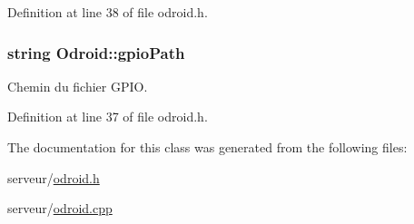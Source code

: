 Definition at line 38 of file odroid.\-h.

\hypertarget{classOdroid_af59f177765cdc44dd1bca01f1d2e568c}{
\subsubsection[{gpio\-Path}]{\setlength{\rightskip}{0pt plus 5cm}string Odroid\-::gpio\-Path\hspace{0.3cm}{\ttfamily [private]}}}\label{classOdroid_af59f177765cdc44dd1bca01f1d2e568c}
Chemin du fichier G\-P\-I\-O. 

Definition at line 37 of file odroid.\-h.



The documentation for this class was generated from the following files\-:\begin{DoxyCompactItemize}
\item 
serveur/\hyperlink{odroid_8h}{odroid.\-h}\item 
serveur/\hyperlink{odroid_8cpp}{odroid.\-cpp}\end{DoxyCompactItemize}
